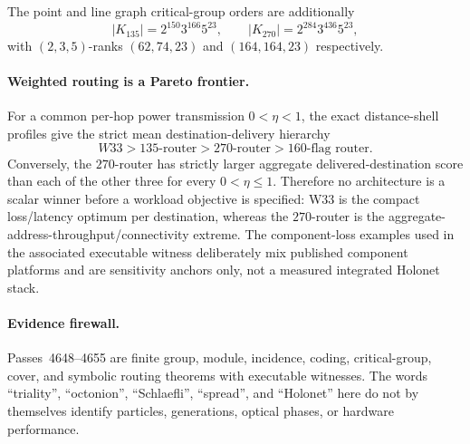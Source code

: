 The point and line graph critical-group orders are additionally
\[
 |K_{135}|=2^{150}3^{166}5^{23},
 \qquad
 |K_{270}|=2^{284}3^{436}5^{23},
\]
with $(2,3,5)$-ranks $(62,74,23)$ and $(164,164,23)$ respectively.

\paragraph{Weighted routing is a Pareto frontier.}
For a common per-hop power transmission $0<\eta<1$, the exact distance-shell
profiles give the strict mean destination-delivery hierarchy
\[
  W33>135\text{-router}>270\text{-router}>160\text{-flag router}.
\]
Conversely, the $270$-router has strictly larger aggregate delivered-destination
score than each of the other three for every $0<\eta\le1$.  Therefore no
architecture is a scalar winner before a workload objective is specified:
W33 is the compact loss/latency optimum per destination, whereas the
$270$-router is the aggregate-address-throughput/connectivity extreme.  The
component-loss examples used in the associated executable witness deliberately
mix published component platforms and are sensitivity anchors only, not a
measured integrated Holonet stack.

\paragraph{Evidence firewall.}
Passes~4648--4655 are finite group, module, incidence, coding, critical-group,
cover, and symbolic routing theorems with executable witnesses.  The words
``triality'', ``octonion'', ``Schlaefli'', ``spread'', and ``Holonet'' here do
not by themselves identify particles, generations, optical phases, or hardware
performance.
